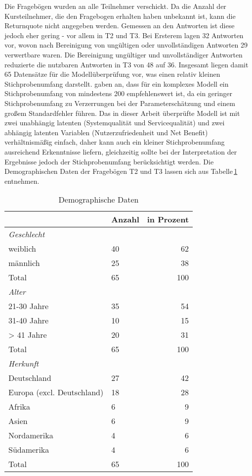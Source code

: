    
Die Fragebögen wurden an alle Teilnehmer verschickt. Da die Anzahl der Kursteilnehmer, die den Fragebogen erhalten haben unbekannt ist, kann die Returnquote nicht angegeben werden. Gemessen an den Antworten ist diese jedoch eher gering - vor allem in T2 und T3. Bei Ersterem lagen 32 Antworten vor, wovon nach Bereinigung von ungültigen oder unvollständigen Antworten 29 verwertbare waren. Die Bereinigung ungültiger und unvollständiger Antworten reduzierte die nutzbaren Antworten in T3 von 48 auf 36. Insgesamt liegen damit 65 Datensätze für die Modellüberprüfung vor, was einen relativ kleinen Stichprobenumfang darstellt. \textcite[S. 5]{jakobowicz2006understanding} gaben an, dass für ein komplexes Modell ein Stichprobenumfang von mindestens 200 empfehlenswert ist, da ein geringer Stichprobenumfang zu Verzerrungen bei der Parameterschätzung und einem großem Standardfehler führen. Das in dieser Arbeit überprüfte Modell ist mit zwei unabhängig latenten (Systemqualität und Servicequalität) und zwei abhängig latenten Variablen (Nutzerzufriedenheit und Net Benefit) verhältnismäßig einfach, daher kann auch ein kleiner Stichprobenumfang ausreichend Erkenntnisse liefern, gleichzeitig sollte bei der Interpretation der Ergebnisse jedoch der Stichprobenumfang berücksichtigt werden. 
Die Demographischen Daten der Fragebögen T2 und T3 lassen sich aus Tabelle\,\ref{tab:Demographische Daten} entnehmen. 
 

\begin{table}[ht] 
\footnotesize
\caption{Demographische Daten}
\label{tab:Demographische Daten} 
\begin{tabular}{@{}lp{5cm}r@{}} \toprule

 & \textbf{Anzahl}&\textbf{in Prozent} \\ \midrule

\textit{Geschlecht}		& 				& \\ 
weiblich 				&  40 			& 62 \\
männlich				&  25			& 38 \\ 
Total					&  65			& 100 \\
\textit{Alter}			& 				&   \\
21-30 Jahre				&  35			& 54 \\
31-40 Jahre				&  10			& 15	  \\
> 41 Jahre				&  20 			& 31 \\
Total 					&  65			& 100 \\
\textit{Herkunft}		&				&   \\
Deutschland				& 27 			& 42  \\
Europa (excl. Deutschland) &18			& 28  \\
Afrika 					& 6				& 9   \\
Asien 					& 6				& 9   \\
Nordamerika				& 4				& 6   \\
Südamerika				& 4				& 6	 \\
Total					& 65				& 100  \\ 
  \bottomrule

\end{tabular}	
\end{table}







